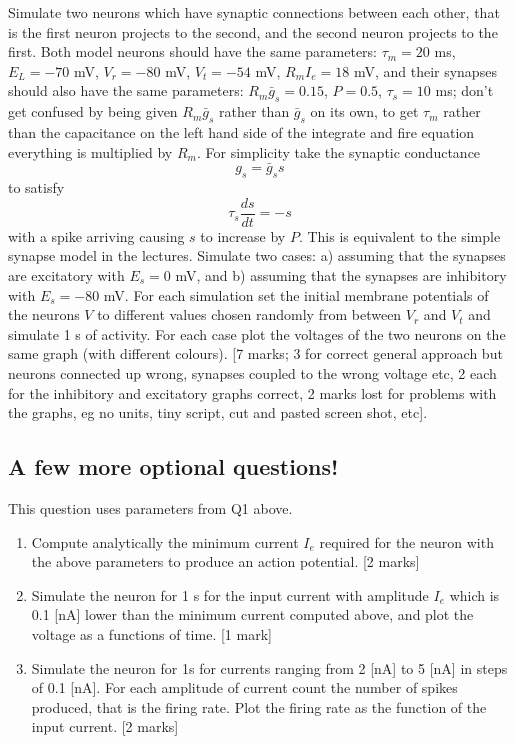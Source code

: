 \documentclass[12pt]{article}
\begin{document}
Simulate two neurons which have synaptic connections between
  each other, that is the first neuron projects to the second, and the
  second neuron projects to the first. Both model neurons should have
  the same parameters: $\tau_m = 20$ ms, $E_L = -70$ mV, $V_r = -80$ mV,
  $V_t = -54$ mV, $R_mI_e = 18$ mV, and their synapses should also have
  the same parameters: $R_m \bar{g}_s = 0.15$, $P = 0.5$, $\tau_s= 10$
  ms; don't get confused by being given $R_m\bar{g}_s$ rather than
  $\bar{g}_s$ on its own, to get $\tau_m$ rather than the capacitance
  on the left hand side of the integrate and fire equation everything
  is multiplied by $R_m$. For simplicity take the synaptic conductance
\begin{equation}
g_s=\bar{g}_s s
\end{equation}
to satisfy
\begin{equation}
\tau_s\frac{ds}{dt}=-s
\end{equation}
with a spike arriving causing $s$ to increase by $P$. This is
equivalent to the simple synapse model in the lectures. Simulate two
cases: a) assuming that the synapses are excitatory with $E_s = 0$ mV,
and b) assuming that the synapses are inhibitory with $E_s = -80$
mV. For each simulation set the initial membrane potentials of the
neurons $V$ to different values chosen randomly from between $V_r$ and
$V_t$ and simulate 1 s of activity. For each case plot the voltages of
the two neurons on the same graph (with different colours). [7 marks;
  3 for correct general approach but neurons connected up wrong,
  synapses coupled to the wrong voltage etc, 2 each for the inhibitory
  and excitatory graphs correct, 2 marks lost for problems with the
  graphs, eg no units, tiny script, cut and pasted screen shot, etc].

\subsection*{A few more optional questions!}

This question uses parameters from Q1 above.

\begin{enumerate}

\item Compute analytically the minimum current $I_e$ required for the
  neuron with the above parameters to produce an action
  potential. [2 marks]

\item Simulate the neuron for 1 s for the input current with amplitude
  $I_e$ which is 0.1 [nA] lower than the minimum current computed
  above, and plot the voltage as a functions of time. [1 mark]

\item Simulate the neuron for 1s for currents ranging from 2 [nA] to 5
  [nA] in steps of 0.1 [nA]. For each amplitude of current count the
  number of spikes produced, that is the firing rate. Plot the firing
  rate as the function of the input current. [2 marks]

\end{enumerate}
\end{document}
